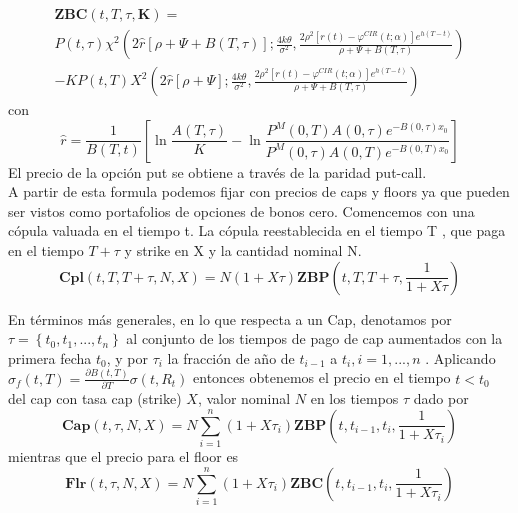 \documentclass[11pt,notitlepage]{article}
\begin{document}
        \begin{multline}\label{SII.CIR++.3}
            \mathbf{ZBC}\left ( t,T,\tau,\mathbf{K} \right )=\\
             P(t,\tau)\chi^{2}\left ( 2\widehat{r}[\rho+\Psi + B(T,\tau) ]; \frac{4k\theta}{\sigma^{2}},\frac{2\rho^{2}[r(t)-\varphi ^{CIR}(t;\alpha)]e^{{h(T-t)}}}{\rho+\Psi + B(T,\tau)} \right )\\
             -KP(t,T)\mathit{X}^{2}\left ( 2\widehat{r}[\rho +\Psi ];\frac{4k\theta}{\sigma^{2}},\frac{2\rho^{2}[r(t)-\varphi ^{CIR}(t;\alpha)]e^{{h(T-t)}}}{\rho+\Psi + B(T,\tau)} \right )
        \end{multline}
        con
        \\
        \begin{equation*}
            \widehat{r}=\frac{1}{B(T,t)}\left [ \ln \frac{A(T,\tau)}{K} -\ln\frac{P^{M}(0,T)A(0,\tau)e^{{-B\left ( 0,\tau \right )}x_{0}}}{P^{M}(0,\tau)A(0,T)e^{{-B\left ( 0,T \right )}x_{0}}} \right]
        \end{equation*}
           El precio de la opción put se obtiene a través de la paridad put-call.\\
        A partir de esta formula podemos  fijar con precios de caps y floors ya que pueden ser vistos como portafolios de opciones de bonos cero.
        Comencemos con una cópula valuada en el tiempo t. La cópula reestablecida en el tiempo T , que paga en el tiempo \(T+\tau\) y strike en X y la cantidad nominal N.
        \begin{equation*}
            \mathbf{Cpl}(t,T,T+\tau,N,X)=N(1+X\tau)\mathbf{ZBP}\left ( t,T,T+\tau,\frac{1}{1+X\tau} \right )
        \end{equation*}
        
            
        En términos más generales, en lo que respecta a un Cap, denotamos por \(\tau =\left \{ t_{0},t_{1},...,t_{n} \right \}\) al conjunto de los tiempos de pago de cap aumentados con la primera fecha \(t_{0}\), y por \(\tau_{i}\) la fracción de año de \(t_{i-1}\)  a \(t_{i}, i=1,...,n\) . Aplicando \(\sigma _{f}\left ( t,T \right )=\frac{\partial B(t,T)}{\partial T}\sigma(t,R_{t})\)
        entonces obtenemos el precio en el tiempo \(t<t_{0}\) del cap con tasa cap (strike) \(X\), valor nominal \(N\) en los tiempos \(\tau\) dado por 
        \begin{equation*}
            \mathbf{Cap}(t,\tau,N,X)= N \sum_{i=1}^{n}\left ( 1+X\tau_{i} \right )\mathbf{ZBP}\left(t,t_{i-1},t_{i},\frac{1}{1+X \tau_{i}}\right)
        \end{equation*}
        mientras que el precio para el floor es 
        \begin{equation*}
        \mathbf{Flr}(t,\tau,N,X)= N \sum_{i=1}^{n}\left ( 1+X\tau_{i} \right )\mathbf{ZBC}\left(t,t_{i-1},t_{i},\frac{1}{1+X \tau_{i}}\right)
        \end{equation*}
          
\end{document}

